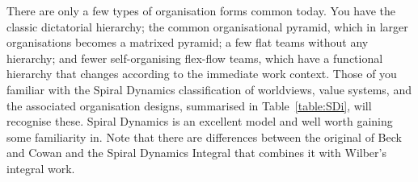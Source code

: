 There are only a few types of organisation forms common today. You have the classic  dictatorial hierarchy; the common organisational pyramid, which in larger organisations becomes a matrixed pyramid; a few flat teams without any hierarchy; and fewer self-organising flex-flow teams, which have a functional hierarchy that changes according to the immediate work context. Those of you familiar with the Spiral Dynamics\cite{beck-SD}  classification of worldviews, value systems, and the associated organisation designs, summarised in Table~\ref{table:SDi}, will recognise these. Spiral Dynamics   is an excellent model and well worth gaining some familiarity in. Note that there are differences between the original of Beck and Cowan\cite{beck-SD} and the Spiral Dynamics Integral that combines it with Wilber’s integral work\cite{wilber-integral}.


